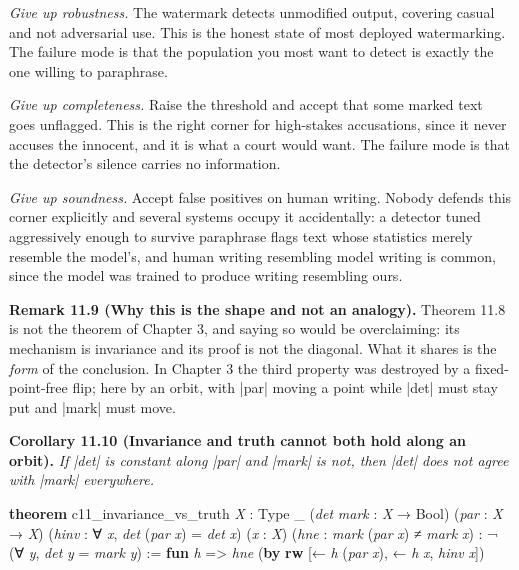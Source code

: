 \documentclass{memoir}
\begin{document}
\emph{Give up robustness.} The watermark detects unmodified output, covering casual
and not adversarial use. This is the honest state of most deployed watermarking.
The failure mode is that the population you most want to detect is exactly the
one willing to paraphrase.

\emph{Give up completeness.} Raise the threshold and accept that some marked text
goes unflagged. This is the right corner for high-stakes accusations, since it
never accuses the innocent, and it is what a court would want. The failure mode
is that the detector's silence carries no information.

\emph{Give up soundness.} Accept false positives on human writing. Nobody defends
this corner explicitly and several systems occupy it accidentally: a detector
tuned aggressively enough to survive paraphrase flags text whose statistics
merely resemble the model's, and human writing resembling model writing is
common, since the model was trained to produce writing resembling ours.

\textbf{Remark 11.9 (Why this is the shape and not an analogy).} Theorem 11.8 is not the
theorem of Chapter 3, and saying so would be overclaiming: its mechanism is
invariance and its proof is not the diagonal. What it shares is the \emph{form} of
the conclusion. In Chapter 3 the third property was destroyed by a
fixed-point-free flip; here by an orbit, with \LeanVerb|par| moving a point while \LeanVerb|det|
must stay put and \LeanVerb|mark| must move.

\textbf{Corollary 11.10 (Invariance and truth cannot both hold along an orbit).}
\emph{If \LeanVerb|det| is constant along \LeanVerb|par| and \LeanVerb|mark| is not, then \LeanVerb|det| does not agree
with \LeanVerb|mark| everywhere.}

\begin{LeanVerbatim}
\textbf{theorem} c11_invariance_vs_truth \textit{X} : Type _
    (\textit{det} \textit{mark} : \textit{X} → Bool) (\textit{par} : \textit{X} → \textit{X})
    (\textit{hinv} : ∀ \textit{x}, \textit{det} (\textit{par} \textit{x}) = \textit{det} \textit{x})
    (\textit{x} : \textit{X}) (\textit{hne} : \textit{mark} (\textit{par} \textit{x}) ≠ \textit{mark} \textit{x}) :
    ¬ (∀ \textit{y}, \textit{det} \textit{y} = \textit{mark} \textit{y}) :=
  \textbf{fun} \textit{h} => \textit{hne} (\textbf{by} \textbf{rw} [← \textit{h} (\textit{par} \textit{x}), ← \textit{h} \textit{x}, \textit{hinv} \textit{x}])

\end{LeanVerbatim}
\end{document}
